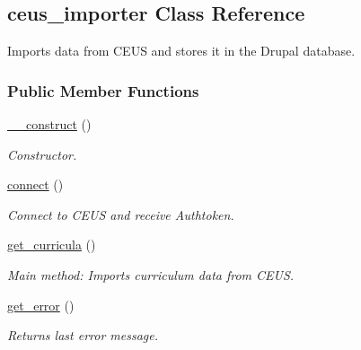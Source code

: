 \hypertarget{classceus__importer}{\subsection{ceus\+\_\+importer Class Reference}
\label{classceus__importer}
}


Imports data from C\+E\+U\+S and stores it in the Drupal database.  


\subsubsection*{Public Member Functions}
\begin{DoxyCompactItemize}
\item 
\hyperlink{classceus__importer_a095c5d389db211932136b53f25f39685}{\+\_\+\+\_\+construct} ()
\begin{DoxyCompactList}\small\item\em Constructor. \end{DoxyCompactList}\item 
\hyperlink{classceus__importer_a78572828d11dcdf2a498497d9001d557}{connect} ()
\begin{DoxyCompactList}\small\item\em Connect to C\+E\+U\+S and receive Authtoken. \end{DoxyCompactList}\item 
\hyperlink{classceus__importer_abd2f9a9afc073169b2badcb571cc983c}{get\+\_\+curricula} ()
\begin{DoxyCompactList}\small\item\em Main method\+: Imports curriculum data from C\+E\+U\+S. \end{DoxyCompactList}\item 
\hyperlink{classceus__importer_a1c0091515372f72e1a87683ca57c74eb}{get\+\_\+error} ()
\begin{DoxyCompactList}\small\item\em Returns last error message. \end{DoxyCompactList}\end{DoxyCompactItemize}
